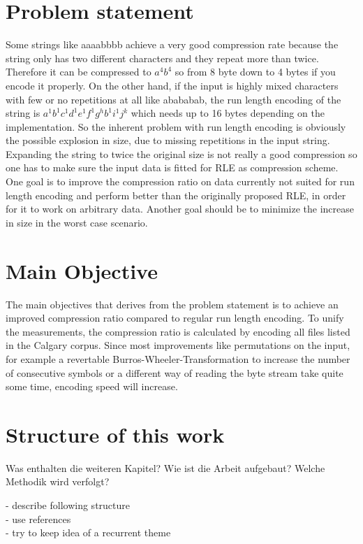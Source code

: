 \section{Problem statement}
\label{ch:Introduction:sec:Problem statement}
\par{
Some strings like aaaabbbb achieve a very good compression rate because the string only has two different characters and they repeat more than twice. Therefore it can be compressed to $a^4b^4$ so from 8 byte down to 4 bytes if you encode it properly. On the other hand, if the input is highly mixed characters with few or no repetitions at all like abababab, the run length encoding of the string is $a^1b^1c^1d^1e^1f^1g^hb^1i^1j^k$ which needs up to 16 bytes depending on the implementation. So the inherent problem with run length encoding is obviously the possible explosion in size, due to missing repetitions in the input string. Expanding the string to twice the original size is not really a good compression so one has to make sure the input data is fitted for RLE as compression scheme. One goal is to improve the compression ratio on data currently not suited for run length encoding and perform better than the originally proposed RLE, in order for it to work on arbitrary data. Another goal should be to minimize the increase in size in the worst case scenario.}

\section{Main Objective}
\label{ch:Introduction:sec:Main Objective}
\par{
The main objectives that derives from the problem statement is to achieve an improved compression ratio compared to regular run length encoding. To unify the measurements, the compression ratio is calculated by encoding all files listed in the Calgary corpus. Since most improvements like permutations on the input, for example a revertable Burros-Wheeler-Transformation to increase the number of consecutive symbols or a different way of reading the byte stream take quite some time, encoding speed will increase.
}
\section{Structure of this work}
\label{ch:Intoduction:sec:Structure}

Was enthalten die weiteren Kapitel? Wie ist die Arbeit aufgebaut? Welche Methodik wird verfolgt?

- describe following structure\\
- use references\\
- try to keep idea of a recurrent theme\\

